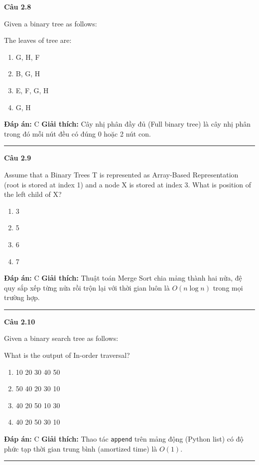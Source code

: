 \documentclass[11pt,a4paper]{article}
\newenvironment{question}[1]{%
  \par\vspace{1em}\noindent\textbf{\large Câu #1}\par\vspace{0.4em}
}{%
  \par\vspace{1em}\hrule\vspace{0.6em}
}
\newenvironment{choices}{%
  \begin{enumerate}[label=\textbf{\Alph*.},leftmargin=2.2em,itemsep=2pt,topsep=3pt]
}{%
  \end{enumerate}
}
\newcommand{\choice}{\item}
\begin{document}
\begin{question}{2.8}
Given a binary tree as follows:
\begin{center}
\end{center}
The leaves of tree are:
\begin{choices}
\choice G, H, F
\choice B, G, H
\choice E, F, G, H
\choice G, H
\end{choices}
\textbf{Đáp án:} C
\textbf{Giải thích:} Cây nhị phân đầy đủ (Full binary tree) là cây nhị phân trong đó mỗi nút đều có đúng 0 hoặc 2 nút con.
\end{question}

\begin{question}{2.9}
Assume that a Binary Trees T is represented as Array-Based Representation (root is stored at index 1) and a node X is stored at index 3. What is position of the left child of X?
\begin{choices}
\choice 3
\choice 5
\choice 6
\choice 7
\end{choices}
\textbf{Đáp án:} C
\textbf{Giải thích:} Thuật toán Merge Sort chia mảng thành hai nửa, đệ quy sắp xếp từng nửa rồi trộn lại với thời gian luôn là $O(n \log n)$ trong mọi trường hợp.
\end{question}

\begin{question}{2.10}
Given a binary search tree as follows:
\begin{center}
\end{center}
What is the output of In-order traversal?
\begin{choices}
\choice 10 20 30 40 50
\choice 50 40 20 30 10
\choice 40 20 50 10 30
\choice 40 20 50 30 10
\end{choices}
\textbf{Đáp án:} C
\textbf{Giải thích:} Thao tác \texttt{append} trên mảng động (Python list) có độ phức tạp thời gian trung bình (amortized time) là $O(1)$.
\end{question}
\end{document}
